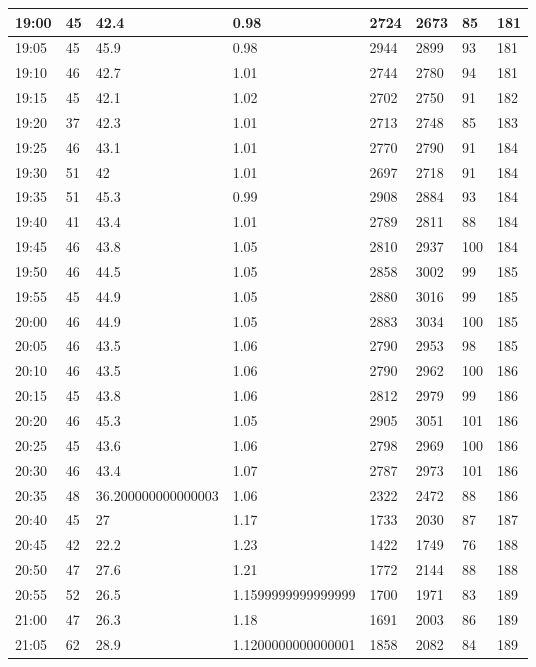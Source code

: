 \documentclass[
]{book}
\begin{document}
\begin{tabular}{l|l|l|l|l|l|l|l}
\hline
19:00 & 45 & 42.4 & 0.98 & 2724 & 2673 & 85 & 181\\
\hline
19:05 & 45 & 45.9 & 0.98 & 2944 & 2899 & 93 & 181\\
\hline
19:10 & 46 & 42.7 & 1.01 & 2744 & 2780 & 94 & 181\\
\hline
19:15 & 45 & 42.1 & 1.02 & 2702 & 2750 & 91 & 182\\
\hline
19:20 & 37 & 42.3 & 1.01 & 2713 & 2748 & 85 & 183\\
\hline
19:25 & 46 & 43.1 & 1.01 & 2770 & 2790 & 91 & 184\\
\hline
19:30 & 51 & 42 & 1.01 & 2697 & 2718 & 91 & 184\\
\hline
19:35 & 51 & 45.3 & 0.99 & 2908 & 2884 & 93 & 184\\
\hline
19:40 & 41 & 43.4 & 1.01 & 2789 & 2811 & 88 & 184\\
\hline
19:45 & 46 & 43.8 & 1.05 & 2810 & 2937 & 100 & 184\\
\hline
19:50 & 46 & 44.5 & 1.05 & 2858 & 3002 & 99 & 185\\
\hline
19:55 & 45 & 44.9 & 1.05 & 2880 & 3016 & 99 & 185\\
\hline
20:00 & 46 & 44.9 & 1.05 & 2883 & 3034 & 100 & 185\\
\hline
20:05 & 46 & 43.5 & 1.06 & 2790 & 2953 & 98 & 185\\
\hline
20:10 & 46 & 43.5 & 1.06 & 2790 & 2962 & 100 & 186\\
\hline
20:15 & 45 & 43.8 & 1.06 & 2812 & 2979 & 99 & 186\\
\hline
20:20 & 46 & 45.3 & 1.05 & 2905 & 3051 & 101 & 186\\
\hline
20:25 & 45 & 43.6 & 1.06 & 2798 & 2969 & 100 & 186\\
\hline
20:30 & 46 & 43.4 & 1.07 & 2787 & 2973 & 101 & 186\\
\hline
20:35 & 48 & 36.200000000000003 & 1.06 & 2322 & 2472 & 88 & 186\\
\hline
20:40 & 45 & 27 & 1.17 & 1733 & 2030 & 87 & 187\\
\hline
20:45 & 42 & 22.2 & 1.23 & 1422 & 1749 & 76 & 188\\
\hline
20:50 & 47 & 27.6 & 1.21 & 1772 & 2144 & 88 & 188\\
\hline
20:55 & 52 & 26.5 & 1.1599999999999999 & 1700 & 1971 & 83 & 189\\
\hline
21:00 & 47 & 26.3 & 1.18 & 1691 & 2003 & 86 & 189\\
\hline
21:05 & 62 & 28.9 & 1.1200000000000001 & 1858 & 2082 & 84 & 189\\

\end{tabular}
\end{document}
